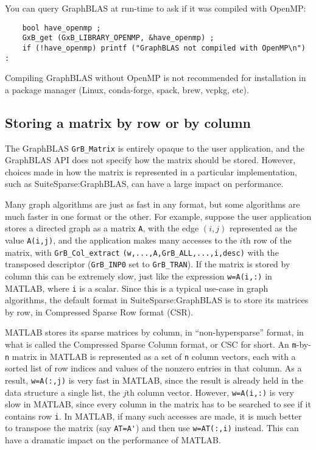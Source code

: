 \documentclass[12pt]{article}
\begin{document}
You can query GraphBLAS at run-time to ask if it was compiled with OpenMP:

\begin{verbatim}
    bool have_openmp ;
    GxB_get (GxB_LIBRARY_OPENMP, &have_openmp) ;
    if (!have_openmp) printf ("GraphBLAS not compiled with OpenMP\n") :
\end{verbatim}

Compiling GraphBLAS without OpenMP is not recommended for installation in a
package manager (Linux, conda-forge, spack, brew, vcpkg, etc).

\subsection{Storing a matrix by row or by column}

The GraphBLAS \verb'GrB_Matrix' is entirely opaque to the user application, and
the GraphBLAS API does not specify how the matrix should be stored.  However,
choices made in how the matrix is represented in a particular implementation,
such as SuiteSparse:GraphBLAS, can have a large impact on performance.

Many graph algorithms are just as fast in any format, but some algorithms are
much faster in one format or the other.  For example, suppose the user
application stores a directed graph as a matrix \verb'A', with the edge $(i,j)$
represented as the value \verb'A(i,j)', and the application makes many accesses
to the $i$th row of the matrix, with \verb'GrB_Col_extract'
\verb'(w,...,A,GrB_ALL,...,i,desc)' with the transposed descriptor
(\verb'GrB_INP0' set to \verb'GrB_TRAN').  If the matrix is stored by column
this can be extremely slow, just like the expression \verb'w=A(i,:)' in MATLAB,
where \verb'i' is a scalar.  Since this is a typical use-case in graph
algorithms, the default format in SuiteSparse:GraphBLAS is to store its
matrices by row, in Compressed Sparse Row format (CSR).

MATLAB stores its sparse matrices by column, in ``non-hypersparse'' format, in
what is called the Compressed Sparse Column format, or CSC for short.  An
\verb'm'-by-\verb'n' matrix in MATLAB is represented as a set of \verb'n'
column vectors, each with a sorted list of row indices and values of the
nonzero entries in that column.  As a result, \verb'w=A(:,j)' is very fast in
MATLAB, since the result is already held in the data structure a single list,
the $j$th column vector.  However, \verb'w=A(i,:)' is very slow in MATLAB,
since every column in the matrix has to be searched to see if it contains row
\verb'i'.  In MATLAB, if many such accesses are made, it is much better to
transpose the matrix (say \verb"AT=A'") and then use \verb"w=AT(:,i)" instead.
This can have a dramatic impact on the performance of MATLAB.
\end{document}
